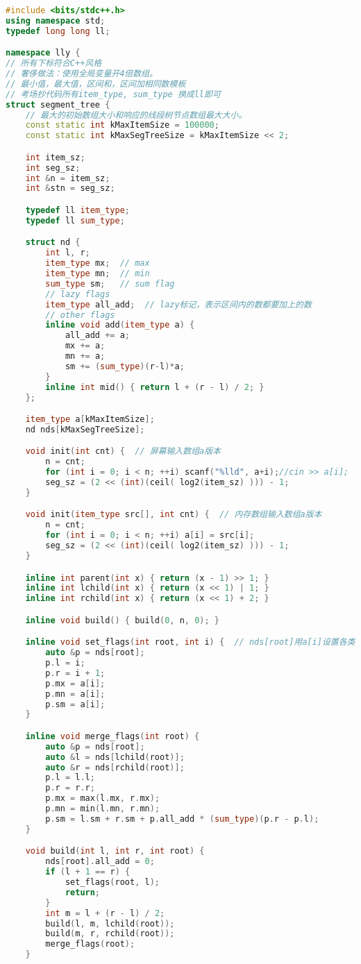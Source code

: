 \begin{lstlisting}[language={c++}]
#include <bits/stdc++.h>
using namespace std;
typedef long long ll;

namespace lly {
// 所有下标符合C++风格
// 奢侈做法：使用全局变量开4倍数组。
// 最小值，最大值，区间和，区间加相同数模板
// 考场抄代码所有item_type, sum_type 换成ll即可
struct segment_tree {
	// 最大的初始数组大小和响应的线段树节点数组最大大小。
	const static int kMaxItemSize = 100000;
	const static int kMaxSegTreeSize = kMaxItemSize << 2;

	int item_sz;
	int seg_sz;
	int &n = item_sz;
	int &stn = seg_sz;

	typedef ll item_type;
	typedef ll sum_type;

	struct nd {
		int l, r;
		item_type mx;  // max
		item_type mn;  // min
		sum_type sm;   // sum flag
		// lazy flags
		item_type all_add;  // lazy标记，表示区间内的数都要加上的数
		// other flags
		inline void add(item_type a) {
			all_add += a;
			mx += a;
			mn += a;
			sm += (sum_type)(r-l)*a;
		}
		inline int mid() { return l + (r - l) / 2; }
	};

	item_type a[kMaxItemSize];
	nd nds[kMaxSegTreeSize];

	void init(int cnt) {  // 屏幕输入数组a版本
		n = cnt;
		for (int i = 0; i < n; ++i) scanf("%lld", a+i);//cin >> a[i];
		seg_sz = (2 << (int)(ceil( log2(item_sz) ))) - 1;
	}

	void init(item_type src[], int cnt) {  // 内存数组输入数组a版本
		n = cnt;
		for (int i = 0; i < n; ++i) a[i] = src[i];
		seg_sz = (2 << (int)(ceil( log2(item_sz) ))) - 1;
	}

	inline int parent(int x) { return (x - 1) >> 1; }
	inline int lchild(int x) { return (x << 1) | 1; }
	inline int rchild(int x) { return (x << 1) + 2; }

	inline void build() { build(0, n, 0); }

	inline void set_flags(int root, int i) {  // nds[root]用a[i]设置各类标志
		auto &p = nds[root];
		p.l = i;
		p.r = i + 1;
		p.mx = a[i];
		p.mn = a[i];
		p.sm = a[i];
	}

	inline void merge_flags(int root) {
		auto &p = nds[root];
		auto &l = nds[lchild(root)];
		auto &r = nds[rchild(root)];
		p.l = l.l;
		p.r = r.r;
		p.mx = max(l.mx, r.mx);
		p.mn = min(l.mn, r.mn);
		p.sm = l.sm + r.sm + p.all_add * (sum_type)(p.r - p.l);
	}

	void build(int l, int r, int root) {
		nds[root].all_add = 0;
		if (l + 1 == r) {
			set_flags(root, l);
			return;
		}
		int m = l + (r - l) / 2;
		build(l, m, lchild(root));
		build(m, r, rchild(root));
		merge_flags(root);
	}


\end{lstlisting}
